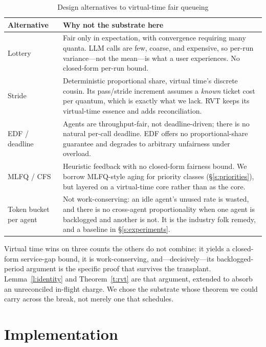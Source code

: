 \documentclass[letterpaper,11pt,leqno]{article}
\begin{document}
\begin{table}[t]
\caption{Design alternatives to virtual-time fair queueing}
\label{t:alternatives}
\begin{tabular*}{\textwidth}{p{2.8cm}@{\extracolsep\fill}p{10.2cm}}
\toprule
Alternative & Why not the substrate here \\
\midrule
Lottery \citep{Waldspurger94} & Fair only in expectation, with convergence requiring many quanta. LLM calls are few, coarse, and expensive, so per-run variance---not the mean---is what a user experiences. No closed-form per-run bound. \\
Stride \citep{Waldspurger95} & Deterministic proportional share, virtual time's discrete cousin. Its pass/stride increment assumes a \emph{known} ticket cost per quantum, which is exactly what we lack. RVT keeps its virtual-time essence and adds reconciliation. \\
EDF / deadline & Agents are throughput-fair, not deadline-driven; there is no natural per-call deadline. EDF offers no proportional-share guarantee and degrades to arbitrary unfairness under overload. \\
MLFQ / CFS & Heuristic feedback with no closed-form fairness bound. We borrow MLFQ-style aging for priority classes (\S\ref{s:priorities}), but layered on a virtual-time core rather than as the core. \\
Token bucket per agent & Not work-conserving: an idle agent's unused rate is wasted, and there is no cross-agent proportionality when one agent is backlogged and another is not. It is the industry folk remedy, and a baseline in \S\ref{s:experiments}. \\
\bottomrule
\end{tabular*}
\end{table}

Virtual time wins on three counts the others do not combine: it yields a closed-form service-gap bound, it is work-conserving, and---decisively---its backlogged-period argument is the specific proof that survives the transplant. Lemma~\ref{l:identity} and Theorem~\ref{t:rvt} are that argument, extended to absorb an unreconciled in-flight charge. We chose the substrate whose theorem we could carry across the break, not merely one that schedules.

\section{Implementation}\label{s:implementation}
\end{document}
